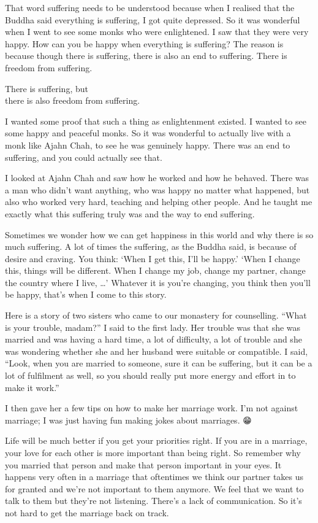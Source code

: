 \documentclass[12pt, openany]{book}
\newenvironment{aphorism}%
{%
\begin{center}\begin{itshape}
}%
{\end{itshape}\end{center}
}%
\begin{document}
That word suffering needs to be understood because when I realised that the Buddha said everything is suffering, I got quite depressed. So it was wonderful when I went to see some monks who were enlightened. I saw that they were very happy. How can you be happy when everything is suffering? The reason is because though there is suffering, there is also an end to suffering. There is freedom from suffering. 

\begin{aphorism}
There is suffering, but\\  
there is also freedom from suffering.
\end{aphorism}

I wanted some proof that such a thing as enlightenment existed. I wanted to see some happy and peaceful monks. So it was wonderful to actually live with a monk like Ajahn Chah, to see he was genuinely happy. There was an end to suffering, and you could actually see that. 

I looked at Ajahn Chah and saw how he worked and how he behaved. There was a man who didn’t want anything, who was happy no matter what happened, but also who worked very hard, teaching and helping other people. And he taught me exactly what this suffering truly was and the way to end suffering. 

Sometimes we wonder how we can get happiness in this world and why there is so much suffering. A lot of times the suffering, as the Buddha said, is because of desire and craving. You think: ‘When I get this, I’ll be happy.’ ‘When I change this, things will be different. When I change my job, change my partner, change the country where I live, …’ Whatever it is you’re changing, you think then you’ll be happy, that’s when I come to this story. 

Here is a story of two sisters who came to our monastery for counselling. “What is your trouble, madam?” I said to the first lady. Her trouble was that she was married and was having a hard time, a lot of difficulty, a lot of trouble and she was wondering whether she and her husband were suitable or compatible. I said, “Look, when you are married to someone, sure it can be suffering, but it can be a lot of fulfilment as well, so you should really put more energy and effort in to make it work.” 

I then gave her a few tips on how to make her marriage work. I’m not against marriage; I was just having fun making jokes about marriages. 😁

Life will be much better if you get your priorities right. If you are in a marriage, your love for each other is more important than being right. So remember why you married that person and make that person important in your eyes. It happens very often in a marriage that oftentimes we think our partner takes us for granted and we’re not important to them anymore. We feel that we want to talk to them but they’re not listening. There’s a lack of communication. So it’s not hard to get the marriage back on track. 
\end{document}

